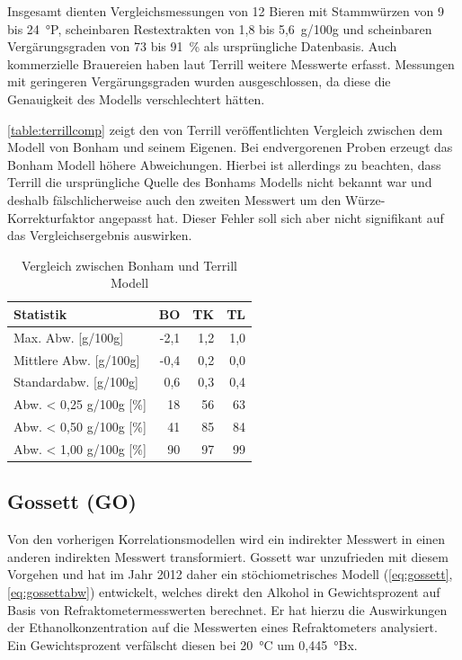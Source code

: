 \documentclass[a4paper,parskip=half]{scrartcl}
\begin{document}
Insgesamt dienten Vergleichsmessungen von 12 Bieren mit Stammwürzen
von 9 bis 24~°P, scheinbaren Restextrakten von 1,8 bis
5,6~g/100g und scheinbaren Vergärungsgraden von 73 bis 91~\%
als ursprüngliche Datenbasis. Auch kommerzielle Brauereien haben
laut Terrill weitere Messwerte erfasst. Messungen mit geringeren
Vergärungsgraden wurden ausgeschlossen, da diese die Genauigkeit des
Modells verschlechtert hätten.
\autocite{Terrill2010a,Terrill2011,Terrill2010,Terrill2013}

\autoref{table:terrillcomp} zeigt den von Terrill veröffentlichten
Vergleich zwischen dem Modell von Bonham und seinem Eigenen. Bei
endvergorenen Proben erzeugt das Bonham Modell höhere
Abweichungen. Hierbei ist allerdings zu beachten, dass
Terrill die ursprüngliche Quelle des Bonhams Modells nicht bekannt war
und deshalb fälschlicherweise auch den zweiten Messwert um
den Würze-Korrekturfaktor angepasst hat. Dieser Fehler soll sich
aber nicht signifikant auf das Vergleichsergebnis auswirken.
\autocite{Terrill2010a,Terrill2011,Terrill2010}

\begin{table}[h]
\centering
\begin{tabular}{lrrr}
\toprule
Statistik & BO & TK & TL \\
\midrule
Max. Abw. [g/100g] & -2,1 & 1,2 & 1,0 \\
Mittlere Abw. [g/100g] & -0,4 & 0,2 & 0,0 \\
Standardabw. [g/100g] & 0,6 & 0,3 & 0,4 \\
Abw. < 0,25 g/100g [\%] & 18 & 56 & 63 \\
Abw. < 0,50 g/100g [\%] & 41 & 85 & 84 \\
Abw. < 1,00 g/100g [\%] & 90 & 97 & 99 \\
\bottomrule
\end{tabular}
\caption{Vergleich zwischen Bonham und Terrill Modell}
\label{table:terrillcomp}
\end{table}

\subsection*{Gossett (GO)}

Von den vorherigen Korrelationsmodellen wird ein indirekter
Messwert in einen anderen indirekten Messwert transformiert. Gossett
war unzufrieden mit diesem Vorgehen und hat im Jahr 2012 daher ein
stöchiometrisches Modell (\autoref{eq:gossett}, \autoref{eq:gossettabw})
entwickelt, welches direkt den Alkohol in Gewichtsprozent auf Basis
von Refraktometermesswerten berechnet. Er hat hierzu die Auswirkungen
der Ethanolkonzentration
auf die Messwerten eines Refraktometers analysiert. Ein Gewichtsprozent
verfälscht diesen bei 20~°C um 0,445~°Bx. 
\autocite{Gossett2012,Gossett2012a,Gossett2012b}
\end{document}
